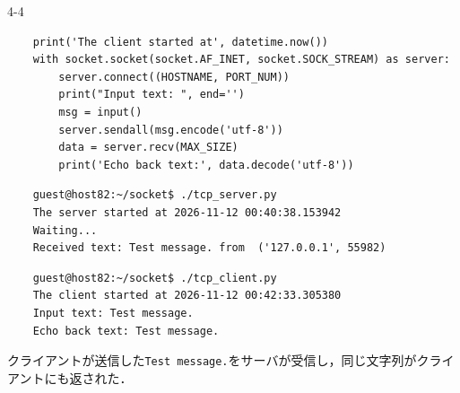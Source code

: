 \begin{maintask}{4-4}
\begin{listing}[H]
\begin{verbatim}
    print('The client started at', datetime.now())
    with socket.socket(socket.AF_INET, socket.SOCK_STREAM) as server:
        server.connect((HOSTNAME, PORT_NUM))
        print("Input text: ", end='')
        msg = input()
        server.sendall(msg.encode('utf-8'))
        data = server.recv(MAX_SIZE)
        print('Echo back text:', data.decode('utf-8'))
    \end{verbatim}
  \end{listing}
  \begin{termout}[H]
    \caption{tcp\_server.py の実行結果}\label{out:tcp_server}
    \begin{verbatim}
    guest@host82:~/socket$ ./tcp_server.py
    The server started at 2026-11-12 00:40:38.153942
    Waiting...
    Received text: Test message. from  ('127.0.0.1', 55982)
    \end{verbatim}
  \end{termout}
  \begin{termout}[H]
    \caption{tcp\_client.py の実行結果}\label{out:tcp_client}
    \begin{verbatim}
    guest@host82:~/socket$ ./tcp_client.py                                                                        
    The client started at 2026-11-12 00:42:33.305380                                                              
    Input text: Test message.                                                                                     
    Echo back text: Test message.   
    \end{verbatim}
  \end{termout}

  クライアントが送信した\texttt{Test message.}をサーバが受信し，同じ文字列がクライアントにも返された．
\end{maintask}
